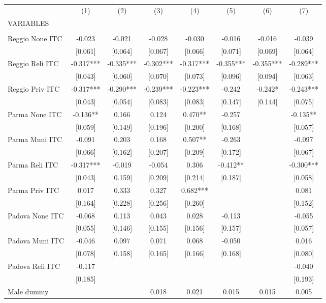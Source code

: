\begin{tabular}{lccccccc} \hline
 & (1) & (2) & (3) & (4) & (5) & (6) & (7) \\
VARIABLES &  &  &  &  &  &  &  \\ \hline
 &  &  &  &  &  &  &  \\
Reggio None ITC & -0.023 & -0.021 & -0.028 & -0.030 & -0.016 & -0.016 & -0.039 \\
 & [0.061] & [0.064] & [0.067] & [0.066] & [0.071] & [0.069] & [0.064] \\
Reggio Reli ITC & -0.317*** & -0.335*** & -0.302*** & -0.317*** & -0.355*** & -0.355*** & -0.289*** \\
 & [0.043] & [0.060] & [0.070] & [0.073] & [0.096] & [0.094] & [0.063] \\
Reggio Priv ITC & -0.317*** & -0.290*** & -0.239*** & -0.223*** & -0.242 & -0.242* & -0.243*** \\
 & [0.043] & [0.054] & [0.083] & [0.083] & [0.147] & [0.144] & [0.075] \\
Parma None ITC & -0.136** & 0.166 & 0.124 & 0.470** & -0.257 &  & -0.135** \\
 & [0.059] & [0.149] & [0.196] & [0.200] & [0.168] &  & [0.057] \\
Parma Muni ITC & -0.091 & 0.203 & 0.168 & 0.507** & -0.263 &  & -0.097 \\
 & [0.066] & [0.162] & [0.207] & [0.209] & [0.172] &  & [0.067] \\
Parma Reli ITC & -0.317*** & -0.019 & -0.054 & 0.306 & -0.412** &  & -0.300*** \\
 & [0.043] & [0.159] & [0.209] & [0.214] & [0.187] &  & [0.058] \\
Parma Priv ITC & 0.017 & 0.333 & 0.327 & 0.682*** &  &  & 0.081 \\
 & [0.164] & [0.228] & [0.256] & [0.260] &  &  & [0.152] \\
Padova None ITC & -0.068 & 0.113 & 0.043 & 0.028 & -0.113 &  & -0.055 \\
 & [0.055] & [0.146] & [0.155] & [0.156] & [0.157] &  & [0.057] \\
Padova Muni ITC & -0.046 & 0.097 & 0.071 & 0.068 & -0.050 &  & 0.016 \\
 & [0.078] & [0.158] & [0.165] & [0.166] & [0.168] &  & [0.080] \\
Padova Reli ITC & -0.117 &  &  &  &  &  & -0.040 \\
 & [0.185] &  &  &  &  &  & [0.193] \\
Male dummy &  &  & 0.018 & 0.021 & 0.015 & 0.015 & 0.005 \\

\end{tabular}
